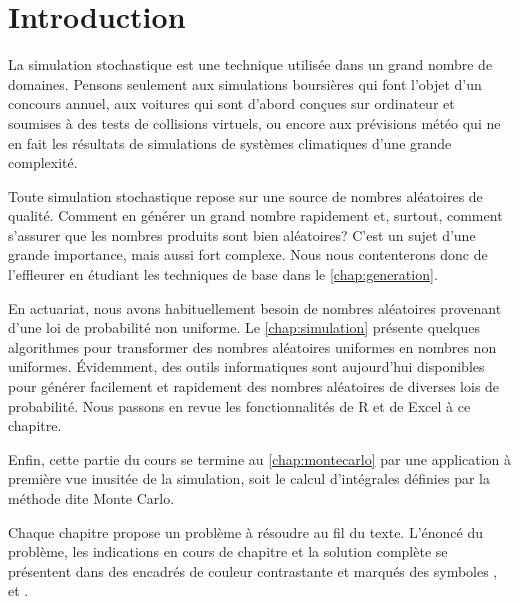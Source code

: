 
\chapter*{Introduction}

La simulation stochastique est une technique utilisée dans un grand
nombre de domaines. Pensons seulement aux simulations boursières qui
font l'objet d'un concours annuel, aux voitures qui sont d'abord
conçues sur ordinateur et soumises à des tests de collisions virtuels,
ou encore aux prévisions météo qui ne en fait les résultats de
simulations de systèmes climatiques d'une grande complexité.

Toute simulation stochastique repose sur une source de nombres
aléatoires de qualité. Comment en générer un grand nombre rapidement
et, surtout, comment s'assurer que les nombres produits sont bien
aléatoires? C'est un sujet d'une grande importance, mais aussi fort
complexe. Nous nous contenterons donc de l'effleurer en étudiant les
techniques de base dans le \autoref{chap:generation}.

En actuariat, nous avons habituellement besoin de nombres aléatoires
provenant d'une loi de probabilité non uniforme. Le
\autoref{chap:simulation} présente quelques algorithmes pour
transformer des nombres aléatoires uniformes en nombres non uniformes.
Évidemment, des outils informatiques sont aujourd'hui disponibles pour
générer facilement et rapidement des nombres aléatoires de diverses
lois de probabilité. Nous passons en revue les fonctionnalités de R et
de Excel à ce chapitre.

Enfin, cette partie du cours se termine au
\autoref{chap:montecarlo} par une application à première vue
inusitée de la simulation, soit le calcul d'intégrales définies par la
méthode dite Monte Carlo.

Chaque chapitre propose un problème à résoudre au fil du texte.
L'énoncé du problème, les indications en cours de chapitre et la
solution complète se présentent dans des encadrés de couleur
contrastante et marqués des symboles {\faCogs}, {\faBolt} et
{\faLightbulbO}.

